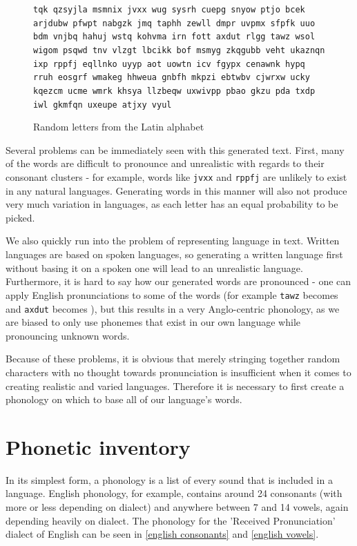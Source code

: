 \documentclass{report}
\begin{document}
   \begin{figure}[h]
   \caption{Random letters from the Latin alphabet}
   \label{random letters from latin alphabet}  
   \begin{tcolorbox}
\texttt{tqk qzsyjla msmnix jvxx wug sysrh cuepg snyow ptjo bcek arjdubw pfwpt nabgzk jmq taphh zewll dmpr uvpmx sfpfk uuo bdm vnjbq hahuj wstq kohvma irn fott axdut rlgg tawz wsol wigom psqwd tnv vlzgt lbcikk bof msmyg zkqgubb veht ukaznqn ixp rppfj eqllnko uyyp aot uowtn icv fgypx cenawnk hypq rruh eosgrf wmakeg hhweua gnbfh mkpzi ebtwbv cjwrxw ucky kqezcm ucme wmrk khsya llzbeqw uxwivpp pbao gkzu pda txdp iwl gkmfqn uxeupe atjxy vyul}
   \end{tcolorbox}
\end{figure}
   
   Several problems can be immediately seen with this generated text. First, many of the words are difficult to pronounce and unrealistic with regards to their consonant clusters - for example, words like \verb|jvxx| and \verb|rppfj| are unlikely to exist in any natural languages. Generating words in this manner will also not produce very much variation in languages, as each letter has an equal probability to be picked.
   
   We also quickly run into the problem of representing language in text. Written languages are based on spoken languages, so generating a written language first without basing it on a spoken one will lead to an unrealistic language. Furthermore, it is hard to say how our generated words are pronounced - one can apply English pronunciations to some of the words (for example \verb|tawz| becomes  and \verb|axdut| becomes ), but this results in a very Anglo-centric phonology, as we are biased to only use phonemes that exist in our own language while pronouncing unknown words.
   
   Because of these problems, it is obvious that merely stringing together random characters with no thought towards pronunciation is insufficient when it comes to creating realistic and varied languages. Therefore it is necessary to first create a phonology on which to base all of our language's words.
   
   \section{Phonetic inventory}
   
   In its simplest form, a phonology is a list of every sound that is included in a language. English phonology, for example, contains around 24 consonants (with more or less depending on dialect) and anywhere between 7 and 14 vowels, again depending heavily on dialect. The phonology for the 'Received Pronunciation' dialect of English can be seen in \ref{english consonants} and \ref{english vowels}.
   
\end{document}
